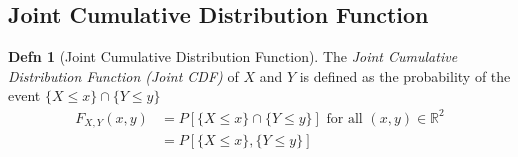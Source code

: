 \documentclass[10pt,letterpaper,final,twoside,notitlepage]{article}
\theoremstyle{plain}
\theoremstyle{definition}
\newtheorem{definition}{Defn}
\begin{document}
	\subsection[Joint CDF]{Joint Cumulative Distribution Function} \label{subsec:Joint CDF}
		\begin{definition}[Joint Cumulative Distribution Function] \label{def:Joint CDF}
			The \emph{Joint Cumulative Distribution Function (Joint CDF)} of $X$ and $Y$ is defined as the probability of the event $ \lbrace X \leq x \rbrace \cap \lbrace Y \leq y \rbrace $
			\begin{equation} \label{eq:Joint CDF}
				\begin{aligned}
					F_{X,Y} \left( x, y \right) &= P \left[ \lbrace X \leq x \rbrace \cap \lbrace Y \leq y \rbrace \right] \text{ for all } \left( x,y \right) \in \mathbb{R}^2 \\
					&= P \left[ \lbrace X \leq x \rbrace , \lbrace Y \leq y \rbrace \right]
				\end{aligned}
			\end{equation}
		\end{definition}
\end{document}
